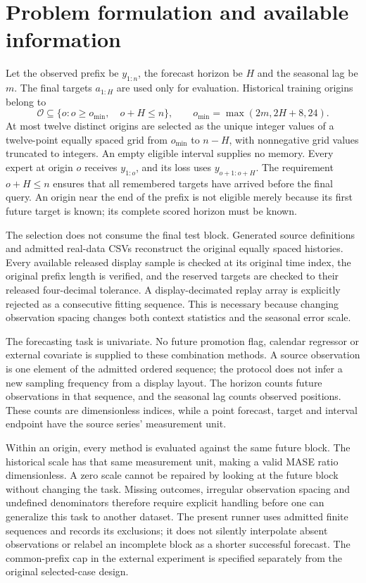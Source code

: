 \documentclass[11pt,a4paper]{article}
\begin{document}


\section{Problem formulation and available information}
Let the observed prefix be $y_{1:n}$, the forecast horizon be $H$ and the seasonal lag be $m$. The final targets $a_{1:H}$ are used only for evaluation. Historical training origins belong to
\begin{equation}
\mathcal O\subseteq\{o:o\geq o_{\min},\quad o+H\leq n\},
\qquad o_{\min}=\max(2m,2H+8,24).
\end{equation}
At most twelve distinct origins are selected as the unique integer values of a twelve-point equally spaced grid from $o_{\min}$ to $n-H$, with nonnegative grid values truncated to integers. An empty eligible interval supplies no memory. Every expert at origin $o$ receives $y_{1:o}$, and its loss uses $y_{o+1:o+H}$. The requirement $o+H\leq n$ ensures that all remembered targets have arrived before the final query. An origin near the end of the prefix is not eligible merely because its first future target is known; its complete scored horizon must be known.

The selection does not consume the final test block. Generated source definitions and admitted real-data CSVs reconstruct the original equally spaced histories. Every available released display sample is checked at its original time index, the original prefix length is verified, and the reserved targets are checked to their released four-decimal tolerance. A display-decimated replay array is explicitly rejected as a consecutive fitting sequence. This is necessary because changing observation spacing changes both context statistics and the seasonal error scale.

The forecasting task is univariate. No future promotion flag, calendar regressor or external covariate is supplied to these combination methods. A source observation is one element of the admitted ordered sequence; the protocol does not infer a new sampling frequency from a display layout. The horizon counts future observations in that sequence, and the seasonal lag counts observed positions. These counts are dimensionless indices, while a point forecast, target and interval endpoint have the source series' measurement unit.

Within an origin, every method is evaluated against the same future block. The historical scale has that same measurement unit, making a valid MASE ratio dimensionless. A zero scale cannot be repaired by looking at the future block without changing the task. Missing outcomes, irregular observation spacing and undefined denominators therefore require explicit handling before one can generalize this task to another dataset. The present runner uses admitted finite sequences and records its exclusions; it does not silently interpolate absent observations or relabel an incomplete block as a shorter successful forecast. The common-prefix cap in the external experiment is specified separately from the original selected-case design.
\end{document}
